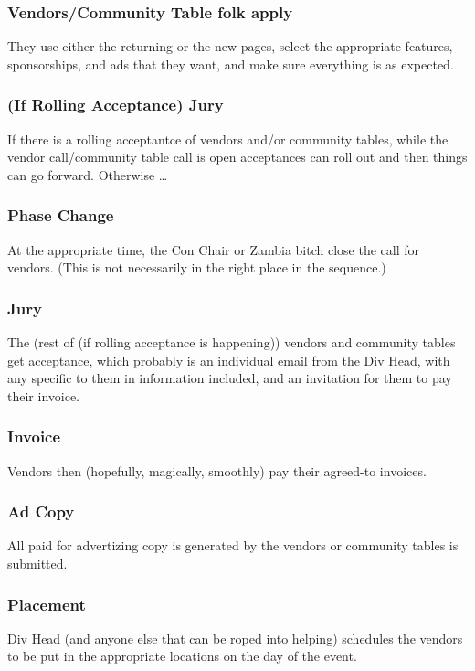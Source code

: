\documentclass[captions=tablesignature]{scrartcl}
\begin{document}
\subsubsection{Vendors/Community Table folk apply}
\label{sec-3-2-11}
They use either the returning or the new pages, select the
appropriate features, sponsorships, and ads that they want, and
make sure everything is as expected.

\subsubsection{(If Rolling Acceptance) Jury}
\label{sec-3-2-12}
If there is a rolling acceptantce of vendors and/or community
tables, while the vendor call/community table call is open
acceptances can roll out and then things can go forward.
Otherwise \ldots{}

\subsubsection{Phase Change}
\label{sec-3-2-13}
At the appropriate time, the Con Chair or Zambia bitch close the
call for vendors. (This is not necessarily in the right place in
the sequence.)

\subsubsection{Jury}
\label{sec-3-2-14}
The (rest of (if rolling acceptance is happening)) vendors and
community tables get acceptance, which probably is an individual
email from the Div Head, with any specific to them in information
included, and an invitation for them to pay their invoice.

\subsubsection{Invoice}
\label{sec-3-2-15}
Vendors then (hopefully, magically, smoothly) pay their agreed-to
invoices.

\subsubsection{Ad Copy}
\label{sec-3-2-16}
All paid for advertizing copy is generated by the vendors or
community tables is submitted.

\subsubsection{Placement}
\label{sec-3-2-17}
Div Head (and anyone else that can be roped into helping)
schedules the vendors to be put in the appropriate locations on
the day of the event.
\end{document}

